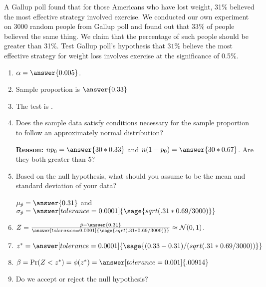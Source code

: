 \documentclass{ximera}
\begin{document}
\begin{problem}
A Gallup poll found that for those Americans who have lost weight, 31\% believed the most
effective strategy involved exercise. We conducted our own experiment on 3000 random people from Gallup poll and found out that 33\% of people believed the same thing. We claim that the percentage of such people should be greater than 31\%. Test Gallup poll's hypothesis that $31\%$ believe the most effective strategy for weight loss involves exercise at the significance of 0.5\%.

\begin{explanation}

\begin{enumerate}
    \item $\alpha=\answer{0.005}$.
    \item Sample proportion is $\answer{0.33}$
     \item The test is .
    \item Does the sample data satisfy conditions necessary for the sample proportion to follow an
approximately normal distribution?
\begin{multipleChoice}
\end{multipleChoice}
{\bf Reason:} $np_0=\answer{30*0.33}$
and $n(1-p_0)=\answer{30*0.67}$. Are they both greater than 5? 
    
    \item Based on the null hypothesis, what should you assume to be the mean and standard deviation of your data? 

$\mu_{\hat p}=\answer{0.31}$ and $\sigma_{\hat p}=\answer[tolerance=0.0001]{\sage{sqrt(.31*0.69/3000)}}$
    \item $Z=\frac{\hat p -\answer{0.31}}{\answer[tolerance=0.0001]{\sage{sqrt(.31*0.69/3000)}}}\approx \mathcal N(0,1)$.
    \item $z^*=\answer[tolerance=0.0001]{\sage{(0.33 -0.31)/(sqrt(.31*0.69/3000))}}$
    \item $\beta=\Pr(Z<z^*)=\phi(z^*)=\answer[tolerance=0.001]{.00914}$
    \item Do we accept or reject the null hypothesis?
    \begin{multipleChoice}
    \end{multipleChoice}
\end{enumerate}
\end{explanation}
\end{problem}
\end{document}
